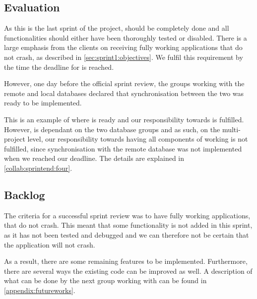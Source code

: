 \subsection{Evaluation}

As this is the last sprint of the project, \launcher should be completely done and all functionalities should either have been thoroughly tested or disabled.
There is a large emphasis from the clients on receiving  fully working applications that do not crash, as described in \cref{sec:sprint1:objectives}.
We fulfil this requirement by the time the deadline for \launcher is reached.

However, one day before the official sprint review, the groups working with the remote and local databases declared that synchronisation between the two was ready to be implemented.

This is an example of where \launcher is ready and our responsibility towards \launcher is fulfilled.
However, \launcher is dependant on the two database groups and as such, on the multi-project level, our responsibility towards having all components of \launcher working is not fulfilled, since synchronisation with the remote database was not implemented when we reached our deadline.
The details are explained in \cref{collab:sprintend:four}.\\

\subsection{Backlog}

The criteria for a successful sprint review was to have fully working applications, that do not crash.
This meant that some functionality is not added in this sprint, as it has not been tested and debugged and we can therefore not be certain that the application will not crash.

As a result, there are some remaining features to be implemented.
Furthermore, there are several ways the existing code can be improved as well.
A description of what can be done by the next group working with \launcher can be found in \cref{appendix:futureworks}.